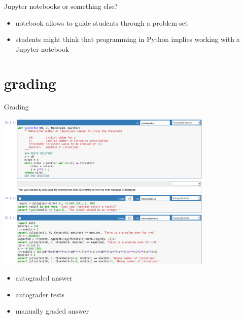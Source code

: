 \documentclass[svgnames]{beamer}
\begin{document}
\begin{frame}{Jupyter notebooks or something else?}
 \vspace{0.5truecm}
 \begin{itemize}
  \item notebook allows to guide students through a problem set
  \item students might think that programming in Python implies
	working with a Jupyter notebook
 \end{itemize}
\end{frame}

\section{grading}

\begin{frame}
 \begin{center}
  \begin{minipage}{0.6\textwidth}
   \tableofcontents[currentsection]
  \end{minipage}
 \end{center}
\end{frame}

\begin{frame}{Grading}
 \begin{center}
  \includegraphics[width=0.8\textwidth]{answer_tests}
 \end{center}
 \begin{itemize}
  \item autograded answer
  \item autograder tests
  \item manually graded answer
 \end{itemize}
\end{frame}
\end{document}
